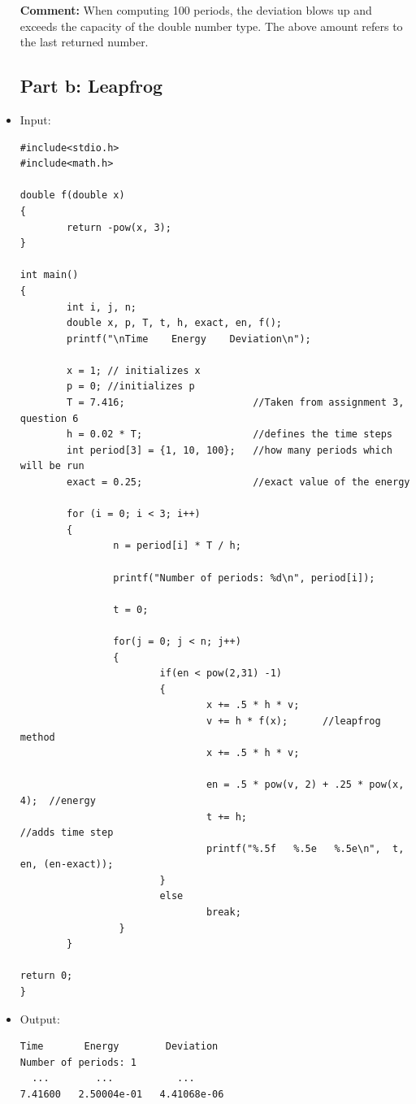 \documentclass[10pt]{article}
\begin{document}
\begin{itemize}
\textbf{Comment:} When computing 100 periods, the deviation blows up and exceeds the capacity of the double number type. The above amount refers to the last returned number. 

\subsection*{Part b: Leapfrog}
\item Input:
\begin{verbatim}
#include<stdio.h>
#include<math.h>

double f(double x)
{
        return -pow(x, 3);
}

int main()
{
        int i, j, n;
        double x, p, T, t, h, exact, en, f();
        printf("\nTime    Energy    Deviation\n");
        
        x = 1; // initializes x
        p = 0; //initializes p
        T = 7.416;                      //Taken from assignment 3, question 6
        h = 0.02 * T;                   //defines the time steps
        int period[3] = {1, 10, 100};   //how many periods which will be run
        exact = 0.25;                   //exact value of the energy

        for (i = 0; i < 3; i++)
        {
                n = period[i] * T / h;

                printf("Number of periods: %d\n", period[i]);
                
                t = 0;
                
                for(j = 0; j < n; j++)
                {
                        if(en < pow(2,31) -1)
                        { 
                                x += .5 * h * v;
                                v += h * f(x);      //leapfrog method
                                x += .5 * h * v;
                                
                                en = .5 * pow(v, 2) + .25 * pow(x, 4);  //energy
                                t += h;	                               //adds time step
                                printf("%.5f   %.5e   %.5e\n",  t, en, (en-exact));
                        }
                        else
                                break;
                 }
        }

return 0;
}
\end{verbatim}
\item Output:

\begin{verbatim}
Time       Energy        Deviation
Number of periods: 1
  ...        ...           ...
7.41600   2.50004e-01   4.41068e-06


\end{verbatim}
\end{itemize}
\end{document}
